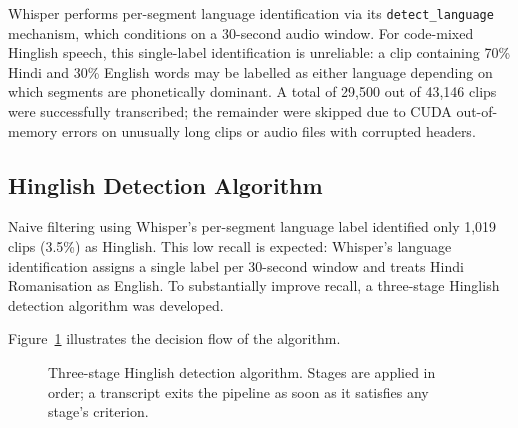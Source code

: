 Whisper performs per-segment language identification via its \texttt{detect\_language} mechanism, which conditions on a 30-second audio window. For code-mixed Hinglish speech, this single-label identification is unreliable: a clip containing 70\% Hindi and 30\% English words may be labelled as either language depending on which segments are phonetically dominant. A total of 29,500 out of 43,146 clips were successfully transcribed; the remainder were skipped due to CUDA out-of-memory errors on unusually long clips or audio files with corrupted headers.

\subsection{Hinglish Detection Algorithm}

Naive filtering using Whisper's per-segment language label identified only 1,019 clips (3.5\%) as Hinglish. This low recall is expected: Whisper's language identification assigns a single label per 30-second window and treats Hindi Romanisation as English. To substantially improve recall, a three-stage Hinglish detection algorithm was developed.

Figure~\ref{fig:tikz_detection} illustrates the decision flow of the algorithm.

\begin{figure}[ht]
\centering
{}
\caption{Three-stage Hinglish detection algorithm. Stages are applied in order; a transcript exits the pipeline as soon as it satisfies any stage's criterion.}
\label{fig:tikz_detection}
\end{figure}

